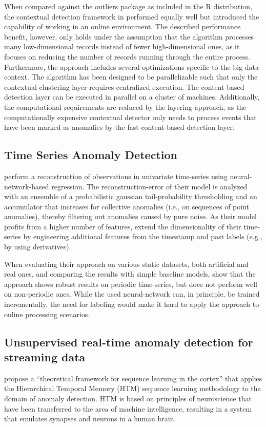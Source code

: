 When compared against the outliers package as included in the R distribution, the contextual detection framework in \citet{hayes_contextual_2015} performed equally well but introduced the capability of working in an online environment. The described performance benefit, however, only holds under the assumption that the algorithm processes many low-dimensional records instead of fewer high-dimensional ones, as it focuses on reducing the number of records running through the entire process. Furthermore, the approach includes several optimizations specific to the big data context. The algorithm has been designed to be parallelizable such that only the contextual clustering layer requires centralized execution. The content-based detection layer can be executed in parallel on a cluster of machines. Additionally, the computational requirements are reduced by the layering approach, as the computationally expensive contextual detector only needs to process events that have been marked as anomalies by the fast content-based detection layer. 


\subsection{Time Series Anomaly Detection \citep{shipmon_time_2017}}
\citet{shipmon_time_2017} perform a reconstruction of observations in univariate time-series using neural-network-based regression. The reconstruction-error of their model is analyzed with an ensemble of a probabilistic gaussian tail-probability thresholding and an accumulator that increases for collective anomalies (i.e., on sequences of point anomalies), thereby filtering out anomalies caused by pure noise. As their model profits from a higher number of features, \citet{shipmon_time_2017} extend the dimensionality of their time-series by engineering additional features from the timestamp and past labels (e.g., by using derivatives).

When evaluating their approach on various static datasets, both artificial and real ones,  and comparing the results with simple baseline models, \citet{shipmon_time_2017} show that the approach shows robust results on periodic time-series, but does not perform well on non-periodic ones. While the used neural-network can, in principle, be trained incrementally, the need for labeling would make it hard to apply the approach to online processing scenarios.


\subsection{Unsupervised real-time anomaly detection for streaming data \citep{ahmad_unsupervised_2017}}
\citet{ahmad_unsupervised_2017} propose a ``theoretical framework for sequence learning in the cortex'' that applies the Hierarchical Temporal Memory (HTM) sequence learning methodology to the domain of anomaly detection. HTM is based on principles of neuroscience that have been transferred to the area of machine intelligence, resulting in a system that emulates synapses and neurons in a human brain.

